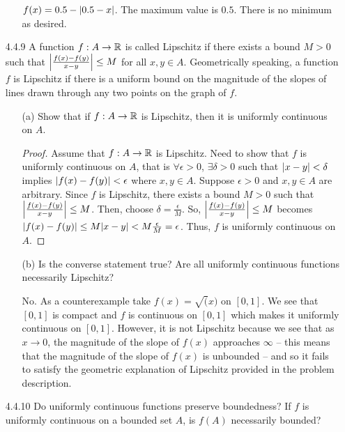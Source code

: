 \documentclass[12pt,letterpaper]{article}
\begin{document}
\begin{itemize}[leftmargin=!,labelindent=5pt]
\begin{itemize}
                    $f(x) = 0.5 - \abs{0.5-x}$. The maximum value is $0.5$. There is no minimum as desired.
            \end{itemize}
        \item [4.4.9] A function $f : A \to \mathbb{R}$ is called Lipschitz if there exists a bound $M > 0$ such that $\abs{\frac{f(x) - f(y)}{x-y}} \leq M$ for all $x,y \in A$. Geometrically speaking, a function $f$ is Lipschitz if there is a uniform bound on the magnitude of the slopes of lines drawn through any two points on the graph of $f$.
            \begin{itemize}
                \item [(a)] Show that if $f : A \to \mathbb{R}$ is Lipschitz, then it is uniformly continuous on $A$.
                    \begin{proof}
                        Assume that $f : A \to \mathbb{R}$ is Lipschitz.
                        Need to show that $f$ is uniformly continuous on $A$, that is $\forall \epsilon > 0$, $\exists \delta > 0$ such that $\abs{x-y} < \delta$ implies $\abs{f(x) - f(y)} < \epsilon$ where $x, y \in A$.
                        Suppose $\epsilon > 0$ and $x,y \in A$ are arbitrary.
                        Since $f$ is Lipschitz, there exists a bound $M > 0$ such that $\abs{\frac{f(x) - f(y)}{x-y}} \leq M$.
                        Then, choose $\delta = \frac{\epsilon}{M}$.
                        So, $\abs{\frac{f(x) - f(y)}{x-y}} \leq M$ becomes $\abs{f(x) - f(y)} \leq M \abs{x - y} < M \frac{\epsilon}{M} = \epsilon$.
                        Thus, $f$ is uniformly continuous on $A$.
                    \end{proof}
                \item [(b)] Is the converse statement true? Are all uniformly continuous functions necessarily Lipschitz?
                    
                    No.
                    As a counterexample take $f(x) = \sqrt(x)$ on $[0, 1]$.
                    We see that $[0,1]$ is compact and $f$ is continuous on $[0,1]$ which makes it uniformly continuous on $[0,1]$.
                    However, it is not Lipschitz because we see that as $x \to 0$, the magnitude of the slope of $f(x)$ approaches $\infty$ -- this means that the magnitude of the slope of $f(x)$ is unbounded -- and so it fails to satisfy the geometric explanation of Lipschitz provided in the problem description.
            \end{itemize}
        \item [4.4.10] Do uniformly continuous functions preserve boundedness? If $f$ is uniformly continuous on a bounded set $A$, is $f(A)$ necessarily bounded?
        

\end{itemize}
\end{document}
